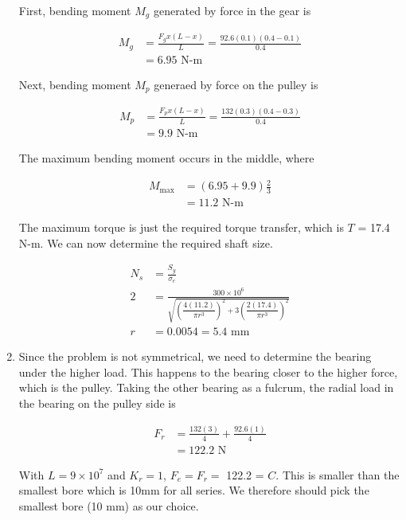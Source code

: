 \documentclass[a4paper,openany]{tufte-book}
\begin{document}
\begin{enumerate}
First, bending moment \(M_{g}\) generated by force in the gear is

\begin{align*}
     M_{g} &= \frac{F_{g}x(L-x)}{L} = \frac{92.6(0.1)(0.4-0.1)}{0.4} \\
           &= 6.95 \text{ N-m}
   \end{align*}

Next, bending moment \(M_{p}\) generaed by force on the pulley is

\begin{align*}
     M_{p} &= \frac{F_{p}x(L-x)}{L} = \frac{132(0.3)(0.4-0.3)}{0.4} \\
           &= 9.9 \text{ N-m}
   \end{align*}

The maximum bending moment occurs in the middle, where

\begin{align*}
     M_{\max} &= (6.95 + 9.9)\frac{2}{3} \\
              &= 11.2 \text{ N-m}
   \end{align*}

The maximum torque is just the required torque transfer, which is
\(T\) = 17.4 N-m. We can now determine the required shaft size.

\begin{align}
  N_{s} &= \frac{S_{y}}{\sigma_{e}} \\
  2 &= \frac{300 \times 10^{6}}{\sqrt{ \left( \dfrac{4(11.2)}{\pi r^{3}} \right)^{2} + 3 \left( \dfrac{2(17.4)}{\pi r^{3}} \right)^{2} }} \\
  r &= 0.0054 = 5.4 \text{ mm}
\end{align}

\item Since the problem is not symmetrical, we need to determine the bearing under the higher load. This happens to the bearing closer to the higher force, which is the pulley. Taking the other bearing as a fulcrum, the radial load in the bearing on the pulley side is

\begin{align*}
     F_{r} &= \frac{132(3)}{4} + \frac{92.6(1)}{4} \\
           &= 122.2 \text{ N}
   \end{align*}

With \(L = 9 \times 10^{7}\) and \(K_{r} = 1\), \(F_{e} = F_{r} =\) 122.2 = \(C\). This is smaller than the smallest bore which is 10mm for all series. We therefore should pick the smallest
bore (10 mm) as our choice.
\end{enumerate}

\backmatter

\printbibliography
\end{document}
